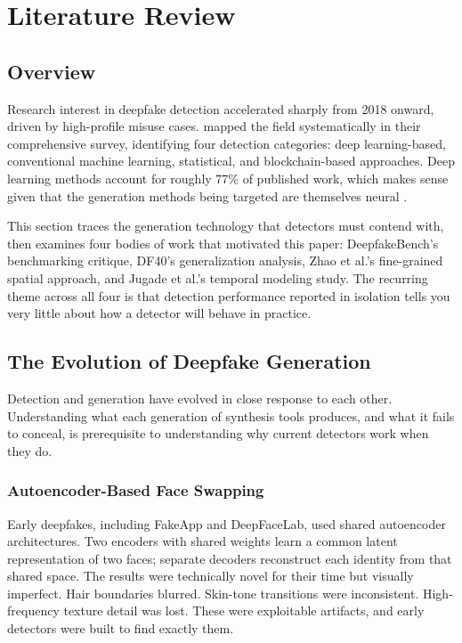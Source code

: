 \section{Literature Review}
\label{sec:lit_review}

\subsection{Overview}
Research interest in deepfake detection accelerated sharply from 2018 onward, driven by high-profile misuse cases. \citet{Rana2022Systematic} mapped the field systematically in their comprehensive survey, identifying four detection categories: deep learning-based, conventional machine learning, statistical, and blockchain-based approaches. Deep learning methods account for roughly 77\% of published work, which makes sense given that the generation methods being targeted are themselves neural \citep{Wang2025MultimodalSurvey}.

This section traces the generation technology that detectors must contend with, then examines four bodies of work that motivated this paper: DeepfakeBench's benchmarking critique, DF40's generalization analysis, Zhao et al.'s fine-grained spatial approach, and Jugade et al.'s temporal modeling study. The recurring theme across all four is that detection performance reported in isolation tells you very little about how a detector will behave in practice.

\subsection{The Evolution of Deepfake Generation}
Detection and generation have evolved in close response to each other. Understanding what each generation of synthesis tools produces, and what it fails to conceal, is prerequisite to understanding why current detectors work when they do.

\subsubsection{Autoencoder-Based Face Swapping}
Early deepfakes, including FakeApp and DeepFaceLab, used shared autoencoder architectures. Two encoders with shared weights learn a common latent representation of two faces; separate decoders reconstruct each identity from that shared space. The results were technically novel for their time but visually imperfect. Hair boundaries blurred. Skin-tone transitions were inconsistent. High-frequency texture detail was lost. These were exploitable artifacts, and early detectors were built to find exactly them.

